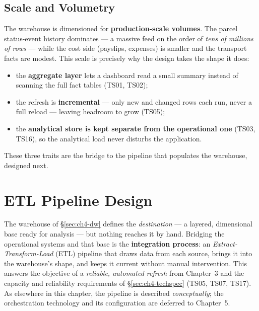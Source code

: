 \subsection{Scale and Volumetry}
\label{subsec:ch4-dw-scale}

The warehouse is dimensioned for \textbf{production-scale volumes}. The parcel status-event history
dominates --- a massive feed on the order of \emph{tens of millions of rows} --- while the cost side
(payslips, expenses) is smaller and the transport facts are modest. This scale is precisely why the
design takes the shape it does:

\begin{itemize}[noitemsep]
    \item the \textbf{aggregate layer} lets a dashboard read a small summary instead of scanning the
          full fact tables (TS01, TS02);
    \item the refresh is \textbf{incremental} --- only new and changed rows each run, never a full
          reload --- leaving headroom to grow (TS05);
    \item the \textbf{analytical store is kept separate from the operational one} (TS03, TS16), so the
          analytical load never disturbs the application.
\end{itemize}

These three traits are the bridge to the pipeline that populates the warehouse, designed next.

\section{ETL Pipeline Design}
\label{sec:ch4-etl}

The warehouse of \S\ref{sec:ch4-dw} defines the \emph{destination} --- a layered, dimensional base
ready for analysis --- but nothing reaches it by hand. Bridging the operational systems and that base
is the \textbf{integration process}: an \emph{Extract-Transform-Load} (ETL) pipeline that draws data
from each source, brings it into the warehouse's shape, and keeps it current without manual
intervention. This answers the objective of a \emph{reliable, automated refresh} from Chapter~3 and the
capacity and reliability requirements of \S\ref{sec:ch4-techspec} (TS05, TS07, TS17). As elsewhere in
this chapter, the pipeline is described \emph{conceptually}; the orchestration technology and its
configuration are deferred to Chapter~5.

